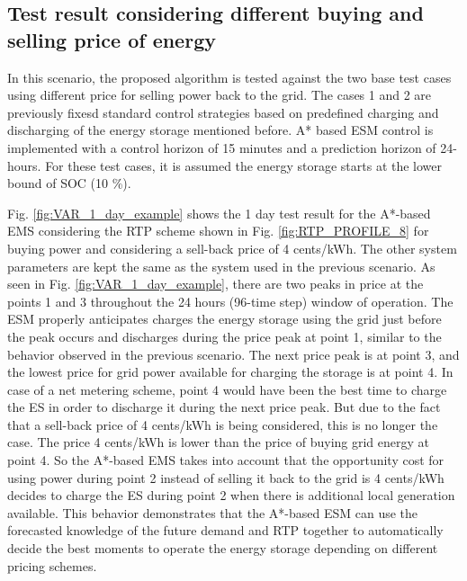 \subsection{Test result considering different buying and selling price of energy}
In this scenario, the proposed algorithm is tested against the two base test cases using different price for selling power back to the grid. The cases 1 and 2 are previously fixesd standard control strategies based on predefined charging and discharging of the energy storage mentioned before. A* based ESM control is implemented with a control horizon of 15 minutes and a prediction horizon of 24-hours. For these test cases, it is assumed the energy storage starts at the lower bound of SOC (10 \%).

Fig. \ref{fig:VAR_1_day_example} shows the 1 day test result for the A*-based EMS considering the RTP scheme shown in Fig. \ref{fig:RTP_PROFILE_8} for buying power and considering a sell-back price of 4 cents/kWh. The other system parameters are kept the same as the system used in the previous scenario. As seen in Fig. \ref{fig:VAR_1_day_example}, there are two peaks in price at the points 1 and 3 throughout the 24 hours (96-time step) window of operation. The ESM properly anticipates charges the energy storage using the grid just before the peak occurs and discharges during the price peak at point 1, similar to the behavior observed in the previous scenario. The next price peak is at point 3, and the lowest price for grid power available for charging the storage is at point 4. In case of a net metering scheme, point 4 would have been the best time to charge the ES in order to discharge it during the next price peak. But due to the fact that a sell-back price of 4 cents/kWh is being considered, this is no longer the case. The price 4 cents/kWh is lower than the price of buying grid energy at point 4. So the A*-based EMS takes into account that the opportunity cost for using power during point 2 instead of selling it back to the grid is 4 cents/kWh decides to charge the ES during point 2 when there is additional local generation available. This behavior demonstrates that the A*-based ESM can use the forecasted knowledge of the future demand and RTP together to automatically decide the best moments to operate the energy storage depending on different pricing schemes.

